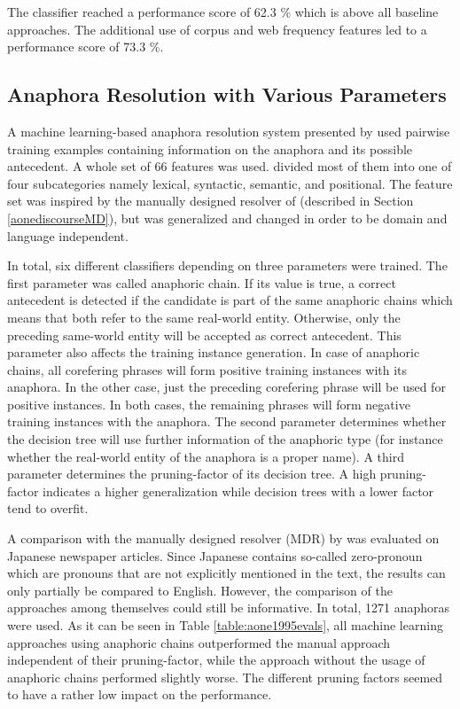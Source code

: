The classifier reached a performance score of 62.3 \% which is above all baseline approaches. The additional use of corpus and web frequency features led to a performance score of 73.3 \%. 

\subsection{Anaphora Resolution with Various Parameters}
\label{aoneBennetEval}
A machine learning-based anaphora resolution system presented by \cite{aone1995evaluating} used pairwise training examples containing information on the anaphora and its possible antecedent. A whole set of 66 features was used. \cite{aone1995evaluating} divided most of them into one of four subcategories namely lexical, syntactic, semantic, and positional. The feature set was inspired by the manually designed resolver of \cite{aone1993language} (described in Section \ref{aonediscourseMD}), but was generalized and changed in order to be domain and language independent.

In total, six different classifiers depending on three parameters were trained. The first parameter was called anaphoric chain. If its value is true, a correct antecedent is detected if the candidate is part of the same anaphoric chains which means that both refer to the same real-world entity. Otherwise, only the preceding same-world entity will be accepted as correct antecedent. This parameter also affects the training instance generation. In case of anaphoric chains, all corefering phrases will form positive training instances with its anaphora. In the other case, just the preceding corefering phrase will be used for positive instances. In both cases, the remaining phrases will form negative training instances with the anaphora. The second parameter determines whether the decision tree will use further information of the anaphoric type (for instance whether the real-world entity of the anaphora is a proper name). A third parameter determines the pruning-factor of its decision tree. A high pruning-factor indicates a higher generalization while decision trees with a lower factor tend to overfit. 

A comparison with the manually designed resolver (MDR) by \cite{aone1993language} was evaluated on Japanese newspaper articles. Since Japanese contains so-called zero-pronoun which are pronouns that are not explicitly mentioned in the text, the results can only partially be compared to English. However, the comparison of the approaches among themselves could still be informative. In total, 1271 anaphoras were used. As it can be seen in Table \ref{table:aone1995evals}, all machine learning approaches using anaphoric chains outperformed the manual approach independent of their pruning-factor, while the approach without the usage of anaphoric chains performed slightly worse. The different pruning factors seemed to have a rather low impact on the performance.

